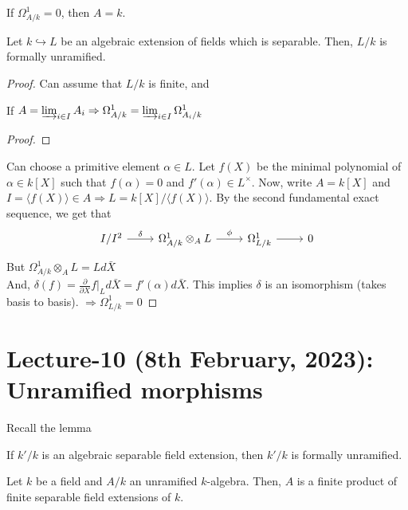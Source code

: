 \documentclass[oneside, 12pt]{scrbook}
\newcommand{\ds}{\displaystyle}
\theoremstyle{theorem}
\begin{document}
\begin{corollary}
If $\Omega_{A/k}^{1} = 0$, then $A=k$.
\end{corollary}

\begin{lemma}
Let $k \hookrightarrow L$ be an algebraic extension of fields which is separable. Then, $L/k$ is formally unramified.
\end{lemma}

\begin{proof}
Can assume that $L/k$ is finite, and 
\begin{lemma}
If $A = \varinjlim_{i \in I} A_{i} \Rightarrow \Omega_{A/k}^{1} = \varinjlim_{i \in I} \Omega_{A_{i}/k}^{1}$
\end{lemma}

\begin{proof}

\end{proof}
Can choose a primitive element $\alpha \in L$. Let $f(X)$ be the minimal polynomial of $\alpha \in k[X]$ such that $f(\alpha)=0$ and $f'(\alpha) \in L^{\times}$. Now, write $A=k[X]$ and $I = \langle f(X)\rangle \in A \Rightarrow L = k[X]/ \langle f(X) \rangle$. By the second fundamental exact sequence, we get that 
\[\begin{tikzcd}
	{I/I^2} & {\Omega_{A/k}^{1} \otimes_{A} L} & {\Omega_{L/k}^{1}} & 0
	\arrow["\delta", from=1-1, to=1-2]
	\arrow["\phi", from=1-2, to=1-3]
	\arrow[from=1-3, to=1-4]
\end{tikzcd}\]
But $\Omega_{A/k}^{1} \otimes_{A} L = L d\bar{X}$ \\

And, $\delta(f) = \ds{\frac{\partial }{\partial X}f|_{L} d\bar{X}= f'(\alpha) d\bar{X}} $. This implies $\delta$ is an isomorphism (takes basis to basis). $\Rightarrow \Omega_{L/k}^{1} = 0$

\end{proof}


\chapter{Lecture-10 (8th February, 2023): Unramified morphisms }

Recall the lemma
\begin{lemma}
If $k'/k$ is an algebraic separable field extension, then $k'/k$ is formally unramified.
\end{lemma}

\begin{proposition}
Let $k$ be a field and $A/k$ an unramified $k$-algebra. Then, $A$ is a finite product of finite separable field extensions of $k$.
\end{proposition}
\end{document}
